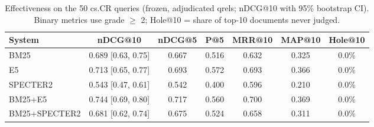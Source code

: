 \begin{table}[t]
\centering
\small
\caption{Effectiveness on the 50 cs.CR queries (frozen, adjudicated qrels; nDCG@10 with 95\% bootstrap CI). Binary metrics use grade $\geq$ 2; Hole@10 = share of top-10 documents never judged.}
\label{tab:fmain}
\begin{tabular}{lcccccc}
\toprule
System & nDCG@10 & nDCG@5 & P@5 & MRR@10 & MAP@10 & Hole@10 \\
\midrule
BM25 & 0.689 [0.63, 0.75] & 0.667 & 0.516 & 0.632 & 0.325 & 0.0\% \\
E5 & 0.713 [0.65, 0.77] & 0.693 & 0.572 & 0.693 & 0.366 & 0.0\% \\
SPECTER2 & 0.543 [0.47, 0.61] & 0.542 & 0.400 & 0.596 & 0.210 & 0.0\% \\
BM25+E5 & 0.744 [0.69, 0.80] & 0.717 & 0.560 & 0.700 & 0.369 & 0.0\% \\
BM25+SPECTER2 & 0.681 [0.62, 0.74] & 0.675 & 0.524 & 0.658 & 0.311 & 0.0\% \\
\bottomrule
\end{tabular}
\end{table}
